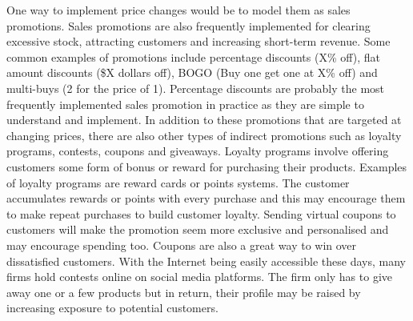 \documentclass[a4paper]{article}
\begin{document}
\newline
\newline
One way to implement price changes would be to model them as sales promotions. Sales promotions are also frequently implemented for clearing excessive stock, attracting customers and increasing short-term revenue. Some common examples of promotions include percentage discounts (X\% off), flat amount discounts (\$X dollars off), BOGO (Buy one get one at X\% off) and multi-buys (2 for the price of 1). Percentage discounts are probably the most frequently implemented sales promotion in practice as they are simple to understand and implement. In addition to these promotions that are targeted at changing prices, there are also other types of indirect promotions such as loyalty programs, contests, coupons and giveaways. Loyalty programs involve offering customers some form of bonus or reward for purchasing their products. Examples of loyalty programs are reward cards or points systems. The customer accumulates rewards or points with every purchase and this may encourage them to make repeat purchases to build customer loyalty. Sending virtual coupons to customers will make the promotion seem more exclusive and personalised and may encourage spending too. Coupons are also a great way to win over dissatisfied customers. With the Internet being easily accessible these days, many firms hold contests online on social media platforms. The firm only has to give away one or a few products but in return, their profile may be raised by increasing exposure to potential customers.
\end{document}
